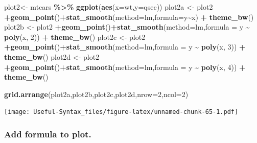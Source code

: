 \documentclass[
]{article}
\newenvironment{Shaded}{\begin{snugshade}}{\end{snugshade}}
\newcommand{\AttributeTok}[1]{\textcolor[rgb]{0.13,0.29,0.53}{#1}}
\newcommand{\DecValTok}[1]{\textcolor[rgb]{0.00,0.00,0.81}{#1}}
\newcommand{\FunctionTok}[1]{\textcolor[rgb]{0.13,0.29,0.53}{\textbf{#1}}}
\newcommand{\NormalTok}[1]{#1}
\newcommand{\OtherTok}[1]{\textcolor[rgb]{0.56,0.35,0.01}{#1}}
\newcommand{\SpecialCharTok}[1]{\textcolor[rgb]{0.81,0.36,0.00}{\textbf{#1}}}
\newcommand{\StringTok}[1]{\textcolor[rgb]{0.31,0.60,0.02}{#1}}
\begin{document}
\begin{Shaded}
\begin{Highlighting}[]
\NormalTok{plot2}\OtherTok{\textless{}{-}}\NormalTok{ mtcars }\SpecialCharTok{\%\textgreater{}\%} \FunctionTok{ggplot}\NormalTok{(}\FunctionTok{aes}\NormalTok{(}\AttributeTok{x=}\NormalTok{wt,}\AttributeTok{y=}\NormalTok{qsec))}
\NormalTok{plot2a }\OtherTok{\textless{}{-}}\NormalTok{ plot2 }\SpecialCharTok{+}\FunctionTok{geom\_point}\NormalTok{()}\SpecialCharTok{+}\FunctionTok{stat\_smooth}\NormalTok{(}\AttributeTok{method=}\StringTok{\textquotesingle{}lm\textquotesingle{}}\NormalTok{,}\AttributeTok{formula=}\NormalTok{y}\SpecialCharTok{\textasciitilde{}}\NormalTok{x) }\SpecialCharTok{+} \FunctionTok{theme\_bw}\NormalTok{()}
\NormalTok{plot2b }\OtherTok{\textless{}{-}}\NormalTok{ plot2 }\SpecialCharTok{+}\FunctionTok{geom\_point}\NormalTok{()}\SpecialCharTok{+}\FunctionTok{stat\_smooth}\NormalTok{(}\AttributeTok{method=}\StringTok{\textquotesingle{}lm\textquotesingle{}}\NormalTok{,}\AttributeTok{formula =}\NormalTok{ y }\SpecialCharTok{\textasciitilde{}} \FunctionTok{poly}\NormalTok{(x, }\DecValTok{2}\NormalTok{)) }\SpecialCharTok{+} \FunctionTok{theme\_bw}\NormalTok{()}
\NormalTok{plot2c }\OtherTok{\textless{}{-}}\NormalTok{ plot2 }\SpecialCharTok{+}\FunctionTok{geom\_point}\NormalTok{()}\SpecialCharTok{+}\FunctionTok{stat\_smooth}\NormalTok{(}\AttributeTok{method=}\StringTok{\textquotesingle{}lm\textquotesingle{}}\NormalTok{,}\AttributeTok{formula =}\NormalTok{ y }\SpecialCharTok{\textasciitilde{}} \FunctionTok{poly}\NormalTok{(x, }\DecValTok{3}\NormalTok{)) }\SpecialCharTok{+} \FunctionTok{theme\_bw}\NormalTok{()}
\NormalTok{plot2d }\OtherTok{\textless{}{-}}\NormalTok{ plot2 }\SpecialCharTok{+}\FunctionTok{geom\_point}\NormalTok{()}\SpecialCharTok{+}\FunctionTok{stat\_smooth}\NormalTok{(}\AttributeTok{method=}\StringTok{\textquotesingle{}lm\textquotesingle{}}\NormalTok{,}\AttributeTok{formula =}\NormalTok{ y }\SpecialCharTok{\textasciitilde{}} \FunctionTok{poly}\NormalTok{(x, }\DecValTok{4}\NormalTok{)) }\SpecialCharTok{+} \FunctionTok{theme\_bw}\NormalTok{()}

\FunctionTok{grid.arrange}\NormalTok{(plot2a,plot2b,plot2c,plot2d,}\AttributeTok{nrow=}\DecValTok{2}\NormalTok{,}\AttributeTok{ncol=}\DecValTok{2}\NormalTok{)}
\end{Highlighting}
\end{Shaded}

\texttt{[image: Useful-Syntax\_files/figure-latex/unnamed-chunk-65-1.pdf]}

\hypertarget{add-formula-to-plot.}{%
\subsubsection{Add formula to plot.}\label{add-formula-to-plot.}}
\end{document}
